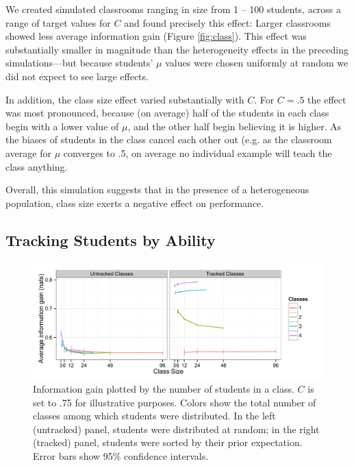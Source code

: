 \documentclass[10pt,letterpaper]{article}
\begin{document}
We created simulated classrooms ranging in size from 1 -- 100 students, across a range of target values for $C$ and found precisely this effect: Larger classrooms showed less average information gain (Figure \ref{fig:class}). This effect was substantially smaller in magnitude than the heterogeneity effects in the preceding simulations---but because students' $\mu$ values were chosen uniformly at random we did not expect to see large effects.

In addition, the class size effect varied substantially with $C$. For $C=.5$ the effect was most pronounced, because (on average) half of the students in each class begin with a lower value of $\mu$, and the other half begin believing it is higher. As the biases of students in the class cancel each other out (e.g. as the classroom average for $\mu$ converges to .5, on average no individual example will teach the class anything. 

Overall, this simulation suggests that in the presence of a heterogeneous population, class size exerts a negative effect on performance. 

\subsection{Tracking Students by Ability}

\begin{figure}
\begin{center}
\includegraphics[width=5.5in]{figures/tracking.pdf}
\end{center}
\caption{\label{fig:tracking} Information gain plotted by the number of students in a class. $C$ is set to .75 for illustrative purposes. Colors show the total number of classes among which students were distributed. In the left (untracked) panel, students were distributed at random; in the right (tracked) panel, students were sorted by their prior expectation. Error bars show 95\% confidence intervals.}
\end{figure}
\end{document}
